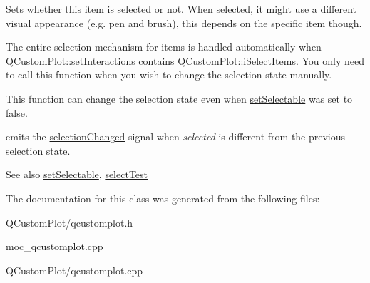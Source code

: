Sets whether this item is selected or not. When selected, it might use a different visual appearance (e.\+g. pen and brush), this depends on the specific item though.

The entire selection mechanism for items is handled automatically when \mbox{\hyperlink{class_q_custom_plot_a5ee1e2f6ae27419deca53e75907c27e5}{Q\+Custom\+Plot\+::set\+Interactions}} contains Q\+Custom\+Plot\+::i\+Select\+Items. You only need to call this function when you wish to change the selection state manually.

This function can change the selection state even when \mbox{\hyperlink{class_q_c_p_abstract_item_a8a8e32a55bc478b849756a78c2d87fd2}{set\+Selectable}} was set to false.

emits the \mbox{\hyperlink{class_q_c_p_abstract_item_aa5cffb034fc65dbb91c77e02c1c14251}{selection\+Changed}} signal when {\itshape selected} is different from the previous selection state.

\begin{DoxySeeAlso}{See also}
\mbox{\hyperlink{class_q_c_p_abstract_item_a8a8e32a55bc478b849756a78c2d87fd2}{set\+Selectable}}, \mbox{\hyperlink{class_q_c_p_abstract_item_ae41d0349d68bb802c49104afd100ba2a}{select\+Test}} 
\end{DoxySeeAlso}


The documentation for this class was generated from the following files\+:\begin{DoxyCompactItemize}
\item 
Q\+Custom\+Plot/qcustomplot.\+h\item 
moc\+\_\+qcustomplot.\+cpp\item 
Q\+Custom\+Plot/qcustomplot.\+cpp\end{DoxyCompactItemize}
